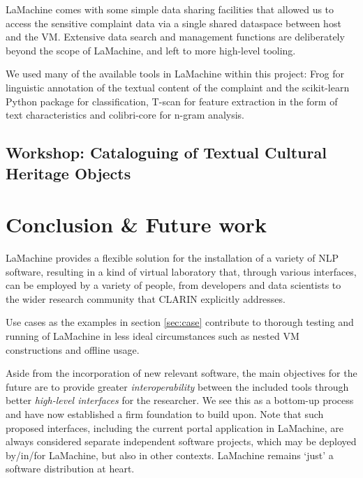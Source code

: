 \documentclass[a4paper,11pt]{article}
\begin{document}
LaMachine comes with some simple data sharing facilities that allowed us to access the sensitive complaint data via a
single shared dataspace between host and the VM. Extensive data search and management functions are deliberately beyond the scope of LaMachine, and left to more high-level tooling.

We used many of the available tools in LaMachine within this project: Frog for linguistic annotation of the textual
content of the complaint and the scikit-learn Python package for classification, T-scan for feature extraction in the form of text characteristics and colibri-core for n-gram analysis.


\subsection{Workshop: Cataloguing of Textual Cultural Heritage Objects}


\section{Conclusion \& Future work}

LaMachine provides a flexible solution for the installation of a variety of NLP software, resulting in a kind
of virtual laboratory that, through various interfaces, can be employed by a variety of people, from developers and data
scientists to the wider research community that CLARIN explicitly addresses.

Use cases as the examples in section \ref{sec:case} contribute to thorough testing and running of LaMachine in less ideal
circumstances such as nested VM constructions and offline usage.

Aside from the incorporation of new relevant software, the main objectives for the future are to provide
greater \emph{interoperability} between the included tools through better \emph{high-level interfaces} for the
researcher. We see this as a bottom-up process and have now established a firm foundation to build upon. Note that such
proposed interfaces, including the current portal application in LaMachine, are always considered separate independent
software projects, which may be deployed by/in/for LaMachine, but also in other contexts. LaMachine remains `just'
a software distribution at heart.
\end{document}
